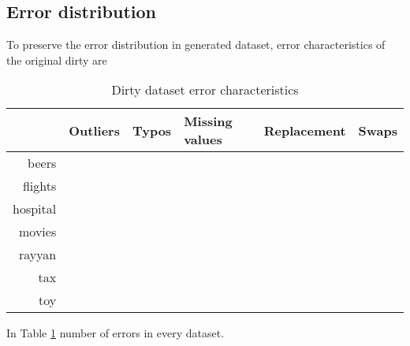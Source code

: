 \subsection{Error distribution}
To preserve the error distribution in generated dataset, error characteristics of the original dirty are %
\begin{table}[!t]
\caption{\label{tab:dirty_num_errors}Dirty dataset error characteristics}
\begin{tabular}{r|l|l|l|l|l}
\toprule
& Outliers & Typos & Missing values & Replacement & Swaps \\ \midrule
beers                &          &       &                &                  &       \\
flights              &          &       &                &                  &       \\
hospital             &          &       &                &                  &       \\
movies               &          &       &                &                  &       \\
rayyan               &          &       &                &                  &       \\
tax                  &          &       &                &                  &       \\
toy                  &          &       &                &                  &       \\ \bottomrule
\end{tabular}
\end{table}
In Table \ref{tab:dirty_num_errors} number of errors in every dataset.

